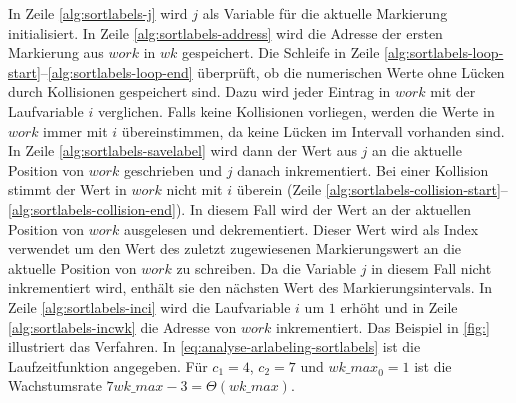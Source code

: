 In Zeile \ref{alg:sortlabels-j} wird $j$ als Variable für die aktuelle Markierung initialisiert. In Zeile
 \ref{alg:sortlabels-address} wird die Adresse der ersten Markierung aus $\mathit{work}$ in $\mathit{wk}$ gespeichert.
 Die Schleife in Zeile \ref{alg:sortlabels-loop-start}--\ref{alg:sortlabels-loop-end} überprüft, ob die numerischen
 Werte ohne Lücken durch Kollisionen gespeichert sind. Dazu wird jeder Eintrag in $\mathit{work}$ mit der Laufvariable
 $i$ verglichen. Falls keine Kollisionen vorliegen, werden die Werte in $\mathit{work}$ immer mit $i$ übereinstimmen,
 da keine Lücken im Intervall vorhanden sind. In Zeile \ref{alg:sortlabels-savelabel} wird dann der Wert aus $j$ an die
 aktuelle Position von $\mathit{work}$ geschrieben und $j$ danach inkrementiert. Bei einer Kollision stimmt der Wert in
 $\mathit{work}$ nicht mit $i$ überein
 (Zeile \ref{alg:sortlabels-collision-start}--\ref{alg:sortlabels-collision-end}). In diesem Fall wird der Wert an der
 aktuellen Position von $\mathit{work}$ ausgelesen und dekrementiert. Dieser Wert wird als Index verwendet um den Wert
 des zuletzt zugewiesenen Markierungswert an die aktuelle Position von $\mathit{work}$ zu schreiben. Da die Variable
 $j$ in diesem Fall nicht inkrementiert wird, enthält sie den nächsten Wert des Markierungsintervals. In Zeile
 \ref{alg:sortlabels-inci} wird die Laufvariable $i$ um $1$ erhöht und in Zeile \ref{alg:sortlabels-incwk} die Adresse
 von $\mathit{work}$ inkrementiert. Das Beispiel in \autoref{fig:} illustriert das Verfahren. In
 \autoref{eq:analyse-arlabeling-sortlabels} ist die Laufzeitfunktion angegeben. Für $c_{1} = 4$, $c_{2} = 7$ und
 $\mathit{wk\_max}_{0} = 1$ ist die Wachstumsrate $7\mathit{wk\_max} - 3 = \Theta(\mathit{wk\_max})$.


